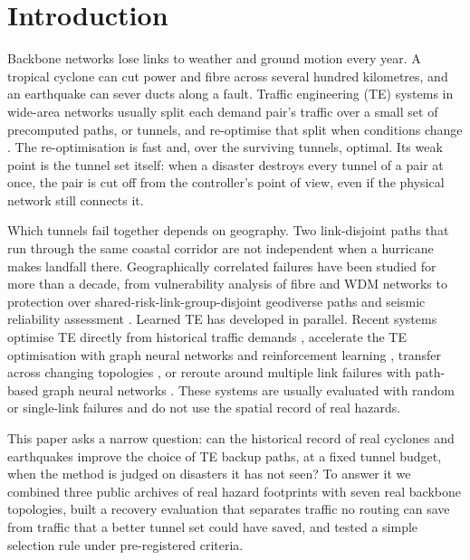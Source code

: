 \documentclass[preprint,12pt]{elsarticle}
\begin{document}
\section{Introduction}
\label{sec:intro}

Backbone networks lose links to weather and ground motion every year. A tropical cyclone can cut power and fibre across several hundred kilometres, and an earthquake can sever ducts along a fault. Traffic engineering (TE) systems in wide-area networks usually split each demand pair's traffic over a small set of precomputed paths, or tunnels, and re-optimise that split when conditions change \cite{prete25,aegis26}. The re-optimisation is fast and, over the surviving tunnels, optimal. Its weak point is the tunnel set itself: when a disaster destroys every tunnel of a pair at once, the pair is cut off from the controller's point of view, even if the physical network still connects it.

Which tunnels fail together depends on geography. Two link-disjoint paths that run through the same coastal corridor are not independent when a hurricane makes landfall there. Geographically correlated failures have been studied for more than a decade, from vulnerability analysis of fibre and WDM networks \cite{neumayer11,agarwal13} to protection over shared-risk-link-group-disjoint geodiverse paths \cite{giraosilva20} and seismic reliability assessment \cite{jimenez23}. Learned TE has developed in parallel. Recent systems optimise TE directly from historical traffic demands \cite{dote23}, accelerate the TE optimisation with graph neural networks and reinforcement learning \cite{teal23}, transfer across changing topologies \cite{harp24,geminet26}, or reroute around multiple link failures with path-based graph neural networks \cite{pathgnn25}. These systems are usually evaluated with random or single-link failures and do not use the spatial record of real hazards.

This paper asks a narrow question: can the historical record of real cyclones and earthquakes improve the choice of TE backup paths, at a fixed tunnel budget, when the method is judged on disasters it has not seen? To answer it we combined three public archives of real hazard footprints with seven real backbone topologies, built a recovery evaluation that separates traffic no routing can save from traffic that a better tunnel set could have saved, and tested a simple selection rule under pre-registered criteria.
\end{document}
